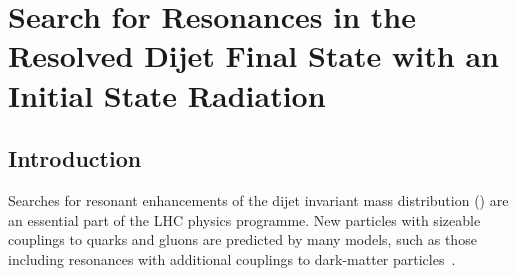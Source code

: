 
\chapter{Search for Resonances in the Resolved Dijet Final State with an Initial State Radiation}
\label{chapter:dijet}

\section{Introduction}

\let\oldTeV\TeV
\let\oldGeV\GeV
\renewcommand{\TeV}{\oldTeV\xspace}
\renewcommand{\GeV}{\oldGeV\xspace}

\newcommand{\PhotonGaussianLimitStatement}{from approximately 100--150~fb at a mean mass of 200~\GeV to approximately 10--20~fb at 1.2~\TeV}
\newcommand{\JetGaussianLimitStatement}{from approximately 100~fb at a mean mass of 350~\GeV to approximately 50~fb at 550~\GeV}
\newcommand{\JetZprimeLimitStatement}{\textbf{To be updated} for $\gq$ above 0.20 at mass $m_{\Zprime}=350$~\GeV and $\gq$ above 0.22 at $m_{\Zprime}=550$~\GeV}

Searches for resonant enhancements of the dijet invariant mass distribution (\mjj) are an essential part of the LHC physics programme.
New particles with sizeable couplings to quarks and gluons are predicted by many models, such as those including resonances with additional couplings to dark-matter particles~\cite{Chala:2015ama,LHCDMF:2015}.

